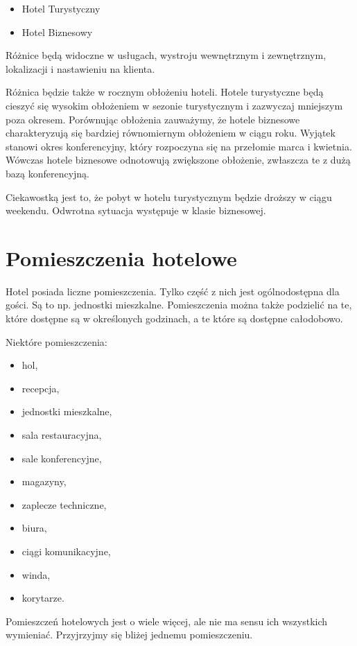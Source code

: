 \documentclass[a4paper,onecolumn,oneside,11pt,wide,floatssmall]{mwrep}
\theoremstyle{definition}
\theoremstyle{plain}%
\theoremstyle{remark}
\begin{document}
\begin{itemize}
  \item Hotel Turystyczny
  \item Hotel Biznesowy
\end{itemize}

Różnice będą widoczne w usługach, wystroju wewnętrznym i zewnętrznym, 
lokalizacji i nastawieniu na klienta.

Różnica będzie także w rocznym obłożeniu hoteli. Hotele turystyczne będą 
cieszyć się wysokim obłożeniem w sezonie turystycznym i zazwyczaj 
mniejszym poza okresem. Porównując obłożenia zauważymy, że hotele biznesowe 
charakteryzują się bardziej równomiernym obłożeniem w ciągu roku. 
Wyjątek stanowi okres konferencyjny, który rozpoczyna się na przełomie 
marca i kwietnia. Wówczas hotele biznesowe odnotowują zwiększone obłożenie,
 zwłaszcza te z dużą bazą konferencyjną.

Ciekawostką jest to, że pobyt w hotelu turystycznym będzie droższy w ciągu 
weekendu. Odwrotna sytuacja występuje w klasie biznesowej.

\section{Pomieszczenia hotelowe}
Hotel posiada liczne pomieszczenia. Tylko część z nich jest ogólnodostępna 
dla gości. Są to np. jednostki mieszkalne. Pomieszczenia można także 
podzielić na te, które dostępne są w określonych godzinach, a te które są 
dostępne całodobowo.

Niektóre pomieszczenia:
\begin{itemize}
\item hol,
\item recepcja,
\item jednostki mieszkalne,
\item sala restauracyjna,
\item sale konferencyjne,
\item magazyny,
\item zaplecze techniczne,
\item biura,
\item ciągi komunikacyjne,
\item winda,
\item korytarze.
\end{itemize}

Pomieszczeń hotelowych jest o wiele więcej, ale nie ma sensu ich wszystkich 
wymieniać. Przyjrzyjmy się bliżej jednemu pomieszczeniu.
\end{document}
